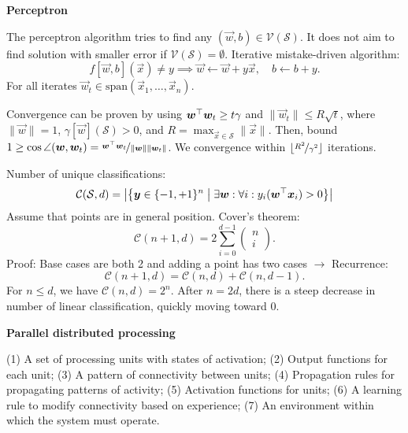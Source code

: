 \documentclass[10pt]{article}
\newenvironment{topic}[1]
{\textbf{\sffamily \colorbox{black}{\rlap{\textbf{\textcolor{white}{#1}}}\hspace{\linewidth}\hspace{-2\fboxsep}}}}
{}
\newenvironment{subtopic}[1]
{\begin{center}\textbf{\sffamily #1}\end{center}}
{}
\begin{document}
\begin{multicols*}{3}
\begin{topic}{Connectionism}
\begin{subtopic}{Perceptron}
            The perceptron algorithm tries to find any $(\vec{w},b) \in \mathcal{V}(\mathcal{S})$. It does not
            aim to find solution with smaller error if $\mathcal{V}(\mathcal{S}) = \emptyset$. Iterative
            mistake-driven algorithm: \[
                f[\vec{w},b](\vec{x}) \neq y \implies \vec{w} \gets \vec{w} + y \vec{x}, \quad b \gets b + y.
            \]
            For all iterates $\vec{w}_t \in \mathrm{span}(\vec{x}_1, \ldots, \vec{x}_n)$.

            Convergence can be proven by using $\bm{w}^\top \bm{w}_t \geq t \gamma$ and $\| \vec{w}_t
                \| \leq R \sqrt{t}$, where $\| \vec{w} \| = 1$, $\gamma[\vec{w}](\mathcal{S}) > 0$, and $R =
                \max_{\vec{x} \in \mathcal{S}} \| \vec{x} \|$. Then, bound $1 \geq \cos\angle{(\bm{w},\bm{w}_t)}
                = \nicefrac{\bm{w}^\top \bm{w}_t}{\| \bm{w} \| \| \bm{w}_t \|}$. We convergence within
            $\lfloor \nicefrac{R^2}{\gamma^2} \rfloor$ iterations.

            Number of unique classifications: \[
                \mathcal{C}(\mathcal{S},d) = \lft| \lft\{ \vec{y} \in \{ -1,+1 \}^n \;\middle|\; \exists \vec{w} : \forall i : y_i (\transpose{\vec{w}}\vec{x}_i) > 0 \rgt\} \rgt|
            \]
            Assume that points are in general position. Cover's theorem: \[
                \mathcal{C}(n+1,d) = 2 \sum_{i=0}^{d-1} \begin{pmatrix} n \\ i \end{pmatrix}.
            \]
            Proof: Base cases are both 2 and adding a point has two cases $\to$ Recurrence: \[
                \mathcal{C}(n+1,d) = \mathcal{C}(n,d) + \mathcal{C}(n,d-1).
            \]
            For $n \leq d$, we have $\mathcal{C}(n,d) = 2^n$. After $n=2d$, there is a steep decrease in number of linear classification, quickly moving toward $0$.
        \end{subtopic}

        \begin{subtopic}{Parallel distributed processing}
            (1) A set of processing units with states of activation; (2) Output functions for each
            unit; (3) A pattern of connectivity between units; (4) Propagation rules for propagating
            patterns of activity; (5) Activation functions for units; (6) A learning rule to modify
            connectivity based on experience; (7) An environment within which the system must operate.
        \end{subtopic}


\end{topic}
\end{multicols*}
\end{document}
